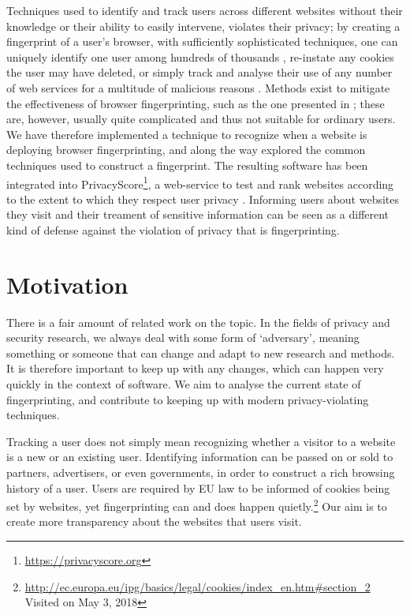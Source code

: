 \documentclass[
    fontsize=12pt,
    headings=small,
    parskip=half,
    bibliography=totoc,
    numbers=noenddot,
    open=any
    ]{scrreprt}
\begin{document}
Techniques used to identify and track users across different websites without
their knowledge or their ability to easily intervene, violates their privacy; by creating a fingerprint
of a user's browser, with sufficiently sophisticated techniques, one can uniquely identify one user
among hundreds of thousands \cite{am_i_unique}, re-instate any cookies the user may have deleted,
or simply track and analyse their use of any number of web services for a multitude of malicious reasons \cite{eckersley2010unique}.
Methods exist to mitigate the effectiveness of browser fingerprinting, such as the one presented
in \cite{laperdrix2015mitigating};
these are, however, usually quite complicated and thus not suitable for ordinary users.
We have therefore implemented a technique to recognize when a website is deploying browser fingerprinting,
and along the way explored the common techniques used to construct a fingerprint. The resulting software has been integrated into
PrivacyScore\footnote{\url{https://privacyscore.org}}, a web-service to test and rank websites according to the extent to which they
respect user privacy \cite{privacyscore}.
Informing users about websites they visit and their treament of sensitive information
can be seen as a different kind of defense against the violation of privacy that is fingerprinting.

\section{Motivation}
There is a fair amount of related work on the topic. In the fields of privacy and security research,
we always deal with some form of `adversary', meaning something or someone that can change and adapt to new
research and methods. It is therefore important to keep up with any changes, which can happen very quickly
in the context of software.
We aim to analyse the current state of fingerprinting, and contribute to keeping up with modern privacy-violating
techniques.

Tracking a user does not simply mean recognizing whether a visitor to a website is a new or an existing user.
Identifying information can be passed on or sold to partners, advertisers, or even governments, in order to
construct a rich browsing history of a user. Users are required by EU law to be informed of cookies being set
by websites, yet fingerprinting can and does happen quietly.\footnote{\url{http://ec.europa.eu/ipg/basics/legal/cookies/index\_en.htm\#section\_2} Visited on May 3, 2018}
Our aim is to create more transparency about the websites that users visit.
\end{document}
